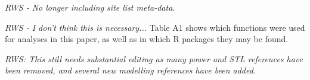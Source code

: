 \documentclass{ametsoc}
\begin{document}
%
\emph{RWS - No longer including site list meta-data.}

\emph{RWS - I don't think this is necessary...}
\appendix[A]
Table A1 shows which functions were used for analyses in this paper, as well as in which R packages they may be found.

%
\emph{RWS: This still needs substantial editing as many power and STL references have been removed, and several new modelling references have been added.}
\end{document}
